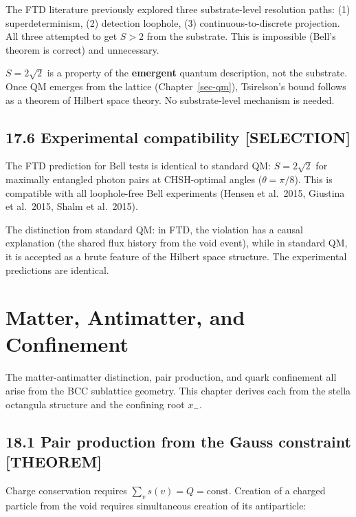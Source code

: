\documentclass[
  11pt,
  letterpaper,
  twoside,
  openright]{book}
\begin{document}
The FTD literature previously explored three substrate-level resolution
paths: (1) superdeterminism, (2) detection loophole, (3)
continuous-to-discrete projection. All three attempted to get \(S > 2\)
from the substrate. This is impossible (Bell's theorem is correct) and
unnecessary.

\(S = 2\sqrt{2}\) is a property of the \textbf{emergent} quantum
description, not the substrate. Once QM emerges from the lattice
(Chapter~\ref{sec-qm}), Tsirelson's bound follows as a theorem of
Hilbert space theory. No substrate-level mechanism is needed.

\section{17.6 Experimental compatibility
{[}SELECTION{]}}\label{experimental-compatibility-selection}

The FTD prediction for Bell tests is identical to standard QM:
\(S = 2\sqrt{2}\) for maximally entangled photon pairs at CHSH-optimal
angles (\(\theta = \pi/8\)). This is compatible with all loophole-free
Bell experiments (Hensen et al.~2015, Giustina et al.~2015, Shalm et
al.~2015).

The distinction from standard QM: in FTD, the violation has a causal
explanation (the shared flux history from the void event), while in
standard QM, it is accepted as a brute feature of the Hilbert space
structure. The experimental predictions are identical.

\chapter{Matter, Antimatter, and Confinement}\label{sec-confinement}

The matter-antimatter distinction, pair production, and quark
confinement all arise from the BCC sublattice geometry. This chapter
derives each from the stella octangula structure and the confining root
\(x_-\).

\section{18.1 Pair production from the Gauss constraint
{[}THEOREM{]}}\label{pair-production-from-the-gauss-constraint-theorem}

Charge conservation requires \(\sum_v s(v) = Q = \text{const}\).
Creation of a charged particle from the void requires simultaneous
creation of its antiparticle:
\end{document}
